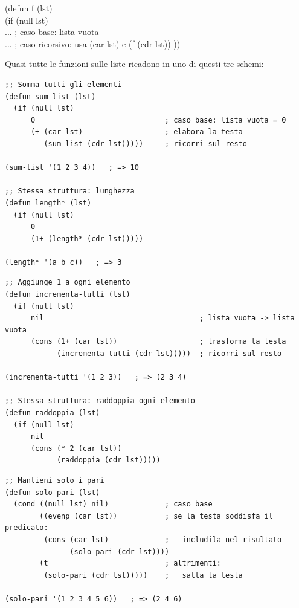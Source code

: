 \begin{sintassi}
(defun f (lst)\\
\hspace{2em}(if (null lst)\\
\hspace{4em}... ; caso base: lista vuota\\
\hspace{4em}... ; caso ricorsivo: usa (car lst) e (f (cdr lst))
))
\end{sintassi}


Quasi tutte le funzioni sulle liste ricadono in uno di questi tre schemi:

\begin{esempio}
\begin{lstlisting}
;; Somma tutti gli elementi
(defun sum-list (lst)
  (if (null lst)
      0                              ; caso base: lista vuota = 0
      (+ (car lst)                   ; elabora la testa
         (sum-list (cdr lst)))))     ; ricorri sul resto

(sum-list '(1 2 3 4))   ; => 10

;; Stessa struttura: lunghezza
(defun length* (lst)
  (if (null lst)
      0
      (1+ (length* (cdr lst)))))

(length* '(a b c))   ; => 3
\end{lstlisting}
\end{esempio}

\begin{esempio}
\begin{lstlisting}
;; Aggiunge 1 a ogni elemento
(defun incrementa-tutti (lst)
  (if (null lst)
      nil                                    ; lista vuota -> lista vuota
      (cons (1+ (car lst))                   ; trasforma la testa
            (incrementa-tutti (cdr lst)))))  ; ricorri sul resto

(incrementa-tutti '(1 2 3))   ; => (2 3 4)

;; Stessa struttura: raddoppia ogni elemento
(defun raddoppia (lst)
  (if (null lst)
      nil
      (cons (* 2 (car lst))
            (raddoppia (cdr lst)))))
\end{lstlisting}
\end{esempio}

\begin{esempio}
\begin{lstlisting}
;; Mantieni solo i pari
(defun solo-pari (lst)
  (cond ((null lst) nil)             ; caso base
        ((evenp (car lst))           ; se la testa soddisfa il predicato:
         (cons (car lst)             ;   includila nel risultato
               (solo-pari (cdr lst))))
        (t                           ; altrimenti:
         (solo-pari (cdr lst)))))    ;   salta la testa

(solo-pari '(1 2 3 4 5 6))   ; => (2 4 6)
\end{lstlisting}
\end{esempio}

